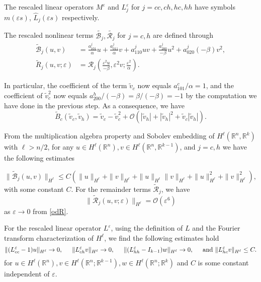 \documentclass[letterpaper,11pt]{article}
\newcommand{\R}{\mathbb{R}}
\newcommand{\rmO}{\mathcal{O}}
\newcommand{\eps}{\varepsilon}
\newcommand{\B}{\mathcal{B}}
\newcommand{\Rm}{\mathcal{R}}
\numberwithin{equation}{section}
\theoremstyle{plain}
\theoremstyle{remark}
\begin{document}
The rescaled linear operators $M^\eps $ and $L^\eps_j$ for $j = cc,ch,hc,hh$ have symbols $m(\eps s)$, $\widehat{L}_j(\eps s)$ respectively. 

The rescaled nonlinear terms $\tilde{\B_j}, \tilde{\Rm_j}$ for $j=c,h$ are defined through 
\begin{align*}
\tilde{\B}_j(u,v)&=\frac{a^j_{101}}{\alpha}  u+\frac{a^j_{011}}{\alpha} v+a^j_{110}uv + \frac{a^j_{200}}{-\beta}u^2+a^j_{020}(-\beta)v^2 ,\\
\tilde{R}_j ( u,v;\eps)&=\Rm_j \left(\frac{\eps^2u}{-\beta},\eps^2v;\frac{\eps^2}{\alpha}\right).
\end{align*}

In particular, the coefficient of the term $\tilde{v}_c$ now equals $ a_{101}^c/\alpha=1$, and the coefficient of $\tilde{v}_c^2$ now equals $a_{200}^h/(-\beta)=\beta/(-\beta)=-1$ by the computation we have done in the previous step. As a consequence, we have 
\[
\tilde{B}_c(\tilde{v}_c,\tilde{v}_h) = \tilde{v}_c-\tilde{v}_c^2 + \rmO(|\tilde{v}_h|+|\tilde{v} _h|^2+\tilde{v}_c|\tilde{v} _h|).
\] 



From the multiplication algebra property and Sobolev embedding of $H^\ell(\R^n,\R^k)$ with $\ell>n/2$, for any $u\in H^\ell(\R^n), v\in H^\ell(\R^n,\R^{k-1})$, and $j=c,h$ we have the following estimates

\begin{equation}\label{Blest}
\|\tilde{\B}_j(u,v)\|_{H^\ell} \le C\left(\|u\|_{H^\ell}+\|v\|_{H^\ell}+\|u\|_{H^\ell}\|v\|_{H^\ell} +\|u\|_{H^\ell}^2+\|v\|^2_{H^\ell}\right),
\end{equation}
with some constant $C$. For the remainder terms $\tilde{\Rm}_j$, we have 
\begin{equation}
 \|\tilde{\Rm}_j(u,v;\eps)\|_{H^\ell} = \rmO(\eps^6)  \label{Nlest}
\end{equation}
as $\eps \to 0$ from \eqref{odR}.

 For the rescaled linear operator $L^\eps$, using the definition of $L$ and the Fourier transform characterization of $H^\ell$, we find the following estimates hold
\begin{equation}\label{Liest}
\|(L^\eps_{cc} - 1)u \|_{H^\ell} \to 0, \hspace{0.2in}\|L^\eps_{ch}v \|_{H^\ell} \to 0, \hspace{0.2in}\|(L^\eps_{hh}-I_{k-1})w \|_{H^\ell} \to 0, \hspace{0.2in} \text{and }\|L^\eps_{hc}v \|_{H^\ell} \le C.
\end{equation}
for $u \in H^\ell(\R^n), v\in H^\ell(\R^n;\R^{k-1}), w\in H^\ell(\R^n;\R^k)$ and $C$ is some constant independent of $\eps$. 
\end{document}
